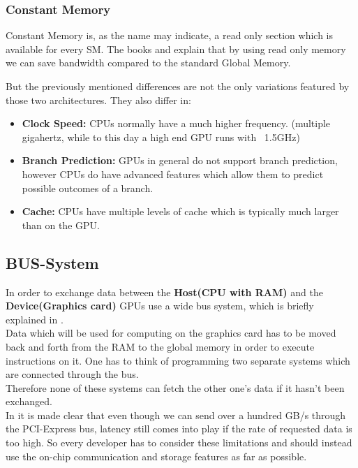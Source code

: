 \documentclass[draft, final]{vutinfth} %
\begin{document}
			\subsubsection{Constant Memory}
			Constant Memory is, as the name may indicate, a read only section which is available for every SM. The books \cite{Sanders:2010:CEI:1891996} and \cite{Kirk:2010:PMP:1841511} explain that by using read only memory we can save bandwidth compared to the standard Global Memory.

		But the previously mentioned differences are not the only variations featured by those two architectures. They also differ in:

		\begin{itemize}
			\item \textbf{Clock Speed:} CPUs normally have a much higher frequency. (multiple gigahertz, while to this day a high end GPU runs with ~1.5GHz)

			\item \textbf{Branch Prediction:} GPUs in general do not support branch prediction, however CPUs do have advanced features which allow them to predict possible outcomes of a branch.

			\item \textbf{Cache:} CPUs have multiple levels of cache which is typically much larger than on the GPU.
		\end{itemize}

		\subsection{BUS-System}
			In order to exchange data between the \textbf{Host(CPU with RAM)} and the \textbf{Device(Graphics card)} GPUs use a wide bus system, which is briefly explained in \cite{Introduction-to-GPUs}.\\
			Data which will be used for computing on the graphics card has to be moved back and forth from the RAM to the global memory in order to execute instructions on it. One has to think of programming two separate systems which are connected through the bus.\\
			Therefore none of these systems can fetch the other one's data if it hasn't been exchanged.\\
			In \cite{Introduction-to-GPUs} it is made clear that even though we can send over a hundred GB/s through the PCI-Express bus, latency still comes into play if the rate of requested data is too high. So every developer has to consider these limitations and should instead use the on-chip communication and storage features as far as possible.
\end{document}
